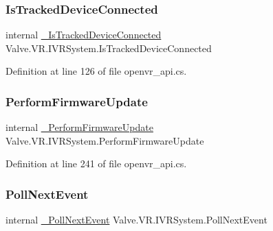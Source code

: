 \mbox{\label{struct_valve_1_1_v_r_1_1_i_v_r_system_a73d69a5a0a052993628d025de426b5f0}} 
\subsubsection{\texorpdfstring{IsTrackedDeviceConnected}{IsTrackedDeviceConnected}}
{\footnotesize\ttfamily internal \mbox{\hyperlink{struct_valve_1_1_v_r_1_1_i_v_r_system_a879d599690d8f4f52620923b283b85c6}{\+\_\+\+Is\+Tracked\+Device\+Connected}} Valve.\+V\+R.\+I\+V\+R\+System.\+Is\+Tracked\+Device\+Connected}



Definition at line 126 of file openvr\+\_\+api.\+cs.

\mbox{\label{struct_valve_1_1_v_r_1_1_i_v_r_system_ac265d711916027dad4c18fddf66c8824}} 
\subsubsection{\texorpdfstring{PerformFirmwareUpdate}{PerformFirmwareUpdate}}
{\footnotesize\ttfamily internal \mbox{\hyperlink{struct_valve_1_1_v_r_1_1_i_v_r_system_ab19faf642558ef1a557fb70618db9ba3}{\+\_\+\+Perform\+Firmware\+Update}} Valve.\+V\+R.\+I\+V\+R\+System.\+Perform\+Firmware\+Update}



Definition at line 241 of file openvr\+\_\+api.\+cs.

\mbox{\label{struct_valve_1_1_v_r_1_1_i_v_r_system_a77dd68df65c7feb90c6bb81aeb49790c}} 
\subsubsection{\texorpdfstring{PollNextEvent}{PollNextEvent}}
{\footnotesize\ttfamily internal \mbox{\hyperlink{struct_valve_1_1_v_r_1_1_i_v_r_system_ad05dee46b825b66c941f09a69ddc2a13}{\+\_\+\+Poll\+Next\+Event}} Valve.\+V\+R.\+I\+V\+R\+System.\+Poll\+Next\+Event}



